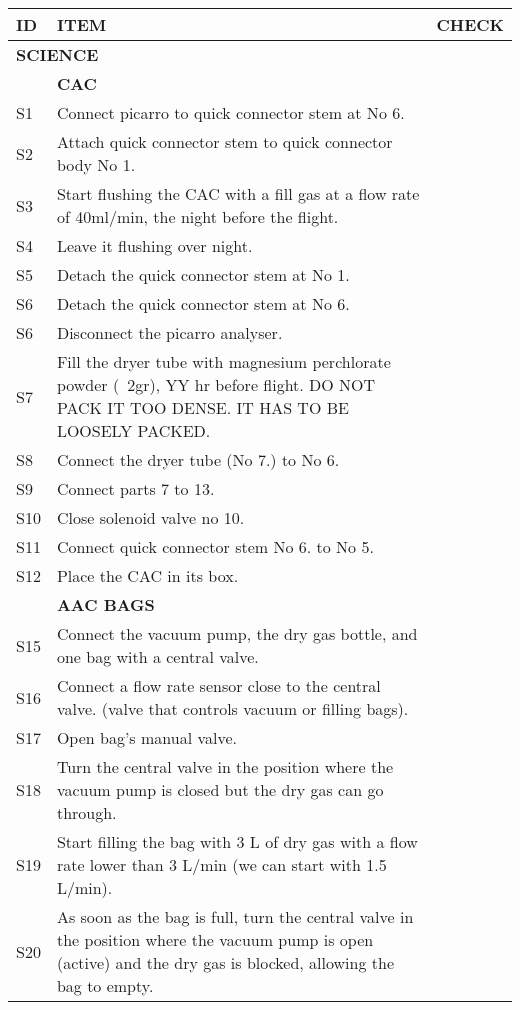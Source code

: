 


\begin{longtable} {|m{}|m{}|m{}|}
\hline
\textbf{ID} & \textbf{ITEM} & \textbf{CHECK} \\
\hline
\multicolumn{2}{|l|}{ \textbf{SCIENCE} } & \\
\hline
& \textbf{CAC} & \\
\hline
S1 & Connect picarro to quick connector stem at No 6. & \\
\hline
S2 & Attach quick connector stem to quick connector body No 1. & \\
\hline
S3 & Start flushing the CAC with a fill gas at a flow rate of 40ml/min, the night before the flight. & \\
\hline
S4 & Leave it flushing over night. & \\
\hline
S5 & Detach the quick connector stem at No 1. & \\
\hline
S6 & Detach the quick connector stem at No 6. & \\
\hline
S6 & Disconnect the picarro analyser. & \\
\hline
S7 & Fill the dryer tube with magnesium perchlorate powder (~2gr), YY hr before flight. DO NOT PACK IT TOO DENSE. IT HAS TO BE LOOSELY PACKED. & \\
\hline
S8 & Connect the dryer tube (No 7.) to No 6. & \\
\hline
S9 & Connect parts 7 to 13. & \\
\hline
S10 & Close solenoid valve no 10. & \\
\hline
S11 & Connect quick connector stem No 6. to No 5. & \\
\hline
S12 & Place the CAC in its box. & \\
\hline
& \textbf{AAC BAGS} & \\
\hline
S15 & Connect the vacuum pump, the dry gas bottle, and one bag with a central valve. & \\
\hline
S16 & Connect a flow rate sensor close to the central valve. (valve that controls vacuum or filling bags). & \\
\hline
S17 & Open bag's manual valve. & \\
\hline
S18 & Turn the central valve in the position where the vacuum pump is closed but the dry gas can go through. & \\
\hline
S19 & Start filling the bag with 3 L of dry gas with a flow rate lower than 3 L/min (we can start with 1.5 L/min). & \\
\hline
S20 & As soon as the bag is full, turn the central valve in the position where the vacuum pump is open (active) and the dry gas is blocked, allowing the bag to empty. & \\

\end{longtable}
